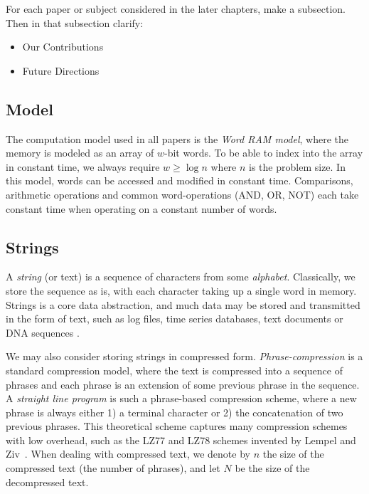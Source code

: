 


\begin{framed}
\noindent For each paper or subject considered in the later chapters, make a subsection. 
Then in that subsection clarify:
\begin{itemize}
    \item Our Contributions
    \item Future Directions
\end{itemize}
\end{framed}

\subsection{Model}
The computation model used in all papers is the \emph{Word RAM model}, where the memory is modeled as an array of $w$-bit words. To be able to index into the array in constant time, we always require $w \geq \log n$ where $n$ is the problem size. In this model, words can be accessed and modified in constant time. Comparisons, arithmetic operations and common word-operations (AND, OR, NOT) each take constant time when operating on a constant number of words. 


\subsection{Strings}
A \emph{string} (or text) is a sequence of characters from some \emph{alphabet}. Classically, we store the sequence as is, with each character taking up a single word in memory. Strings is a core data abstraction, and much data may be stored and transmitted in the form of text, such as log files, time series databases, text documents or DNA sequences . 

We may also consider storing strings in compressed form.
\emph{Phrase-compression} is a standard compression model, where the text is compressed into a sequence of phrases and each phrase is an extension of some previous phrase in the sequence. A \emph{straight line program} is such a phrase-based compression scheme, where a new phrase is always either 1) a terminal character or 2) the concatenation of two previous phrases.
This theoretical scheme captures many compression schemes with low overhead, such as the LZ77 and LZ78 schemes invented by Lempel and Ziv~\cite{lz77,lz78}. 
When dealing with compressed text, we denote by $n$ the size of the compressed text (the number of phrases), and let $N$ be the size of the decompressed text. 

